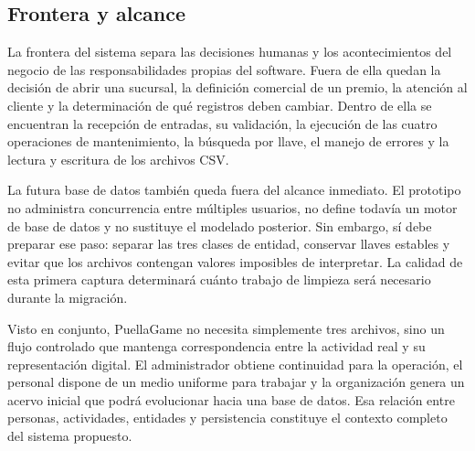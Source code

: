 \subsection{Frontera y alcance}

La frontera del sistema separa las decisiones humanas y los acontecimientos del
negocio de las responsabilidades propias del software. Fuera de ella quedan la
decisión de abrir una sucursal, la definición comercial de un premio, la atención
al cliente y la determinación de qué registros deben cambiar. Dentro de ella se
encuentran la recepción de entradas, su validación, la ejecución de las cuatro
operaciones de mantenimiento, la búsqueda por llave, el manejo de errores y la
lectura y escritura de los archivos CSV.

La futura base de datos también queda fuera del alcance inmediato. El prototipo
no administra concurrencia entre múltiples usuarios, no define todavía un motor
de base de datos y no sustituye el modelado posterior. Sin embargo, sí debe
preparar ese paso: separar las tres clases de entidad, conservar llaves estables
y evitar que los archivos contengan valores imposibles de interpretar. La
calidad de esta primera captura determinará cuánto trabajo de limpieza será
necesario durante la migración.

Visto en conjunto, PuellaGame no necesita simplemente tres archivos, sino un
flujo controlado que mantenga correspondencia entre la actividad real y su
representación digital. El administrador obtiene continuidad para la operación,
el personal dispone de un medio uniforme para trabajar y la organización genera
un acervo inicial que podrá evolucionar hacia una base de datos. Esa relación
entre personas, actividades, entidades y persistencia constituye el contexto
completo del sistema propuesto.
